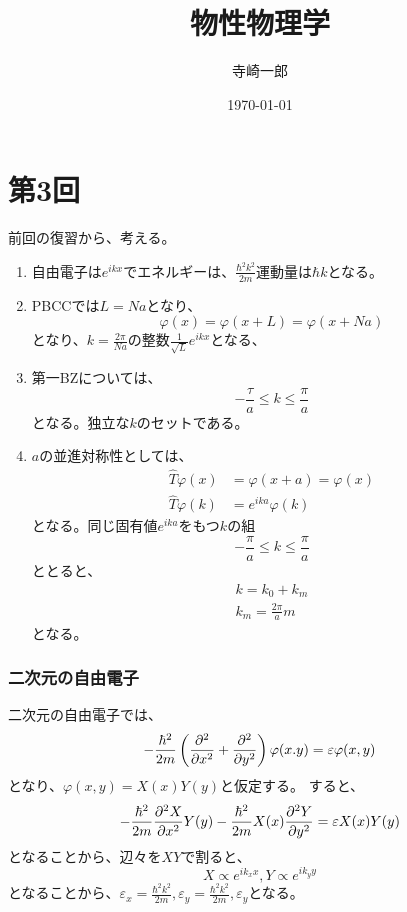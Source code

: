 \documentclass[titlepage]{ltjsarticle}
\begin{document}
\title{物性物理学}
\author{寺崎一郎}
\date{\today}
\maketitle  

\section{第3回}
前回の復習から、考える。
\begin{enumerate}
  \item 自由電子は\(e^{ikx}\)でエネルギーは、\(\frac{\hbar^2k^2}{2m}\)運動量は\(\hbar k\)となる。
  \item PBCCでは\(L=Na\)となり、
  \begin{equation}
    \varphi(x) = \varphi(x+L) = \varphi(x+Na)
  \end{equation}
  となり、\(k=\frac{2 \pi}{Na}\)の整数\(\frac{1}{\sqrt{L}}e^{ikx}\)となる、
  \item 第一BZについては、
  \begin{equation}
    -\frac{\tau}{a} \le k \le \frac{\pi}{a}
  \end{equation}
  となる。独立な\(k\)のセットである。
  \item \(a\)の並進対称性としては、
  \begin{align}
    \hat{T} \varphi(x) &= \varphi(x+a) = \varphi(x) \\
    \hat{T} \varphi(k) &= e^{ika} \varphi(k)
  \end{align}
  となる。同じ固有値\(e^{ika}\)をもつ\(k\)の組
  \begin{equation}
    -\frac{\pi}{a} \le k \le \frac{\pi}{a}
  \end{equation}
  ととると、
  \begin{align}
    k = k_0 + k_m \\
    k_m = \frac{2 \pi}{a}m
  \end{align}
  となる。
\end{enumerate}
\subsubsection{二次元の自由電子}
二次元の自由電子では、
\begin{equation}
  -\frac{\hbar^2}{2m} \left( \pdv[order=2]{}{x} + \pdv[order=2]{}{y} \right)\varphi(x.y) = \varepsilon \varphi(x,y)
\end{equation}
となり、\(\varphi(x,y) = X(x)Y(y)\)と仮定する。
すると、
\begin{equation}
  - \frac{\hbar^2}{2m} \pdv[order=2]{X}{x}Y(y) - \frac{\hbar^2}{2m} X(x) \pdv[order=2]{Y}{y} = \varepsilon X(x)Y(y)
\end{equation}
となることから、辺々を\(XY\)で割ると、
\begin{equation}
  X \propto e^{ik_x x}, Y \propto e^{ik_y y}
\end{equation}
となることから、\(\varepsilon_x = \frac{\hbar^2 k^2}{2m},\varepsilon_y = \frac{\hbar^2 k^2}{2m},\varepsilon_y\)となる。
\end{document}
